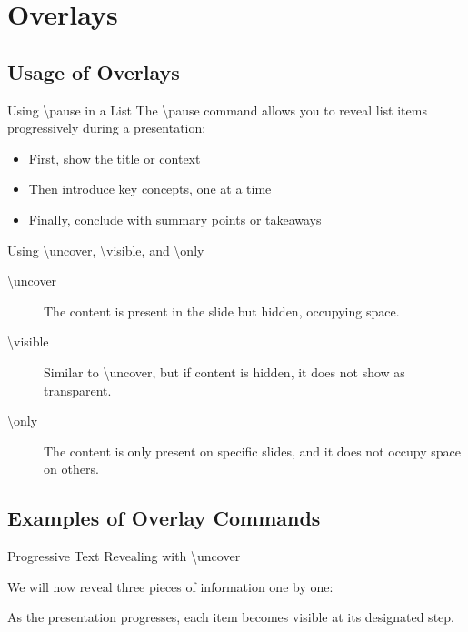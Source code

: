
\section{Overlays}

\subsection{Usage of Overlays}

\begin{frame}{Using \textbackslash pause in a List}
    The \textbackslash pause command allows you to reveal list items progressively during a presentation:
    \begin{itemize}
        \item First, show the title or context
        \pause
        \item Then introduce key concepts, one at a time
        \pause
        \item Finally, conclude with summary points or takeaways
    \end{itemize}
\end{frame}

\begin{frame}{Using \textbackslash uncover, \textbackslash visible, and \textbackslash only}
    \begin{description}
        \item[\textbackslash uncover] The content is present in the slide but hidden, occupying space.
        \item[\textbackslash visible] Similar to \textbackslash uncover, but if content is hidden, it does not show as transparent.
        \item[\textbackslash only] The content is only present on specific slides, and it does not occupy space on others.
    \end{description}
\end{frame}

\subsection{Examples of Overlay Commands}

\begin{frame}{Progressive Text Revealing with \textbackslash uncover}

    We will now reveal three pieces of information one by one:
    \begin{itemize}
    \end{itemize}
    
    As the presentation progresses, each item becomes visible at its designated step.
    
\end{frame}

